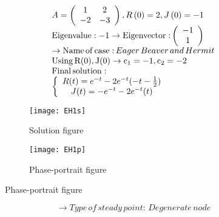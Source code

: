\documentclass[a4paper]{article}
\begin{document}
\[\begin{array}{l}
A = \left( {\begin{array}{*{20}{c}}
1&2\\
{ - 2}&{ - 3}
\end{array}} \right),R\left( 0 \right) = 2,J\left( 0 \right) =  - 1\\
{\rm{Eigenvalue: - 1}} \to {\rm{Eigenvector:}}\left( {\begin{array}{*{20}{c}}
{ - 1}\\
1
\end{array}} \right)\\
 \to {\rm{Name}}\,{\rm{of}}\,{\rm{case:}}\,Eager\,Beaver\,and\,Hermit\\
{\rm{Using}}\,{\rm{R(0), J(0)}} \to {{\rm{c}}_1} =  - 1,{\rm{ }}{{\rm{c}}_2} =  - 2\\
{\rm{Final}}\,{\rm{solution:}}\\
\left\{ {\begin{array}{*{20}{c}}
{R(t) = {e^{ - t}} - 2{e^{ - t}}( - t - \frac{1}{2})}\\
{J(t) =  - {e^{ - t}} - 2{e^{ - t}}(t)}
\end{array}} \right.
\end{array}\]
\begin{figure}[H]
\centering
\begin{subfigure}{.5\textwidth}
  \centering
  \texttt{[image: EH1s]}
  \caption*{Solution figure}
\end{subfigure}%
\begin{subfigure}{.5\textwidth}
  \centering
  \texttt{[image: EH1p]}
  \caption*{Phase-portrait figure}
\end{subfigure}
\end{figure}
\[  \to  Type\,of\,steady\,point:\,Degenerate\,node\]
\end{document}
